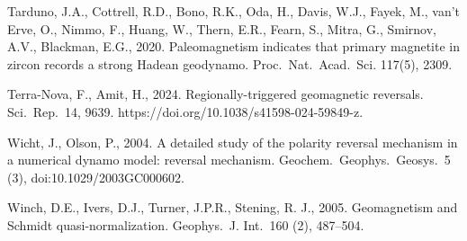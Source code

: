\begin{list}
Tarduno, J.A., Cottrell, R.D., Bono, R.K., Oda, H., Davis, W.J., Fayek, M., van't Erve, O., Nimmo, F., Huang, W., Thern, E.R., Fearn, S., Mitra, G., Smirnov, A.V., Blackman, E.G., 2020. Paleomagnetism indicates that primary magnetite in zircon records a strong Hadean geodynamo. Proc.\ Nat.\ Acad.\ Sci. 117(5), 2309.
%
\item
Terra-Nova, F., Amit, H., 2024. Regionally-triggered geomagnetic reversals. Sci.\ Rep.\ 14, 9639. https://doi.org/10.1038/s41598-024-59849-z.
%
\item
Wicht, J., Olson, P., 2004. A detailed study of the polarity reversal mechanism in a numerical dynamo model: reversal mechanism. Geochem.\ Geophys.\ Geosys.\ 5 (3), doi:10.1029/2003GC000602.
%
\item
Winch, D.E., Ivers, D.J., Turner, J.P.R., Stening, R. J., 2005. Geomagnetism and Schmidt quasi-normalization. Geophys.\ J. Int.\ 160 (2), 487--504.
%
\end{list}